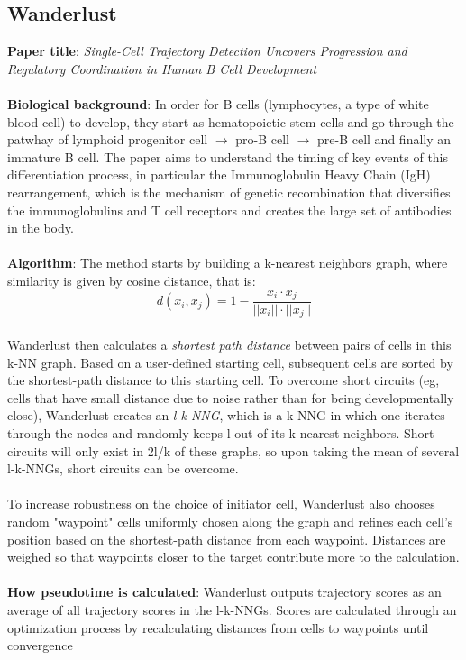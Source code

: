 \documentclass[11pt]{article}
\begin{document}
\subsection{Wanderlust}
\textbf{Paper title}: \emph{Single-Cell Trajectory Detection Uncovers Progression and Regulatory Coordination in Human B Cell Development}\\
\\
\textbf{Biological background}: In order for B cells (lymphocytes, a type of white blood cell) to develop, they start as hematopoietic stem cells and go through the patwhay of lymphoid progenitor cell $\to$ pro-B cell $\to$ pre-B cell and finally an immature B cell. The paper aims to understand the timing of key events of this differentiation process, in particular the Immunoglobulin Heavy Chain (IgH) rearrangement, which is the mechanism of genetic recombination that diversifies the immunoglobulins and T cell receptors and creates the large set of antibodies in the body. \\
\\
\textbf{Algorithm}: The method starts by building a k-nearest neighbors graph, where similarity is given by cosine distance, that is:
$$
d(x_i, x_j) = 1 - \frac{x_i \cdot x_j}{||x_i|| \cdot ||x_j||}
$$
\\
Wanderlust then calculates a \emph{shortest path distance} between pairs of cells in this k-NN graph. Based on a user-defined starting cell, subsequent cells are sorted by the shortest-path distance to this starting cell. To overcome short circuits (eg, cells that have small distance due to noise rather than for being developmentally close), Wanderlust creates an \emph{l-k-NNG}, which is a k-NNG in which one iterates through the nodes and randomly keeps l out of its k nearest neighbors. Short circuits will only exist in 2l/k of these graphs, so upon taking the mean of several l-k-NNGs, short circuits can be overcome. \\
\\
To increase robustness on the choice of initiator cell, Wanderlust also chooses random "waypoint" cells uniformly chosen along the graph and refines each cell's position based on the shortest-path distance from each waypoint. Distances are weighed so that waypoints closer to the target contribute more to the calculation.\\
\\
\textbf{How pseudotime is calculated}: Wanderlust outputs trajectory scores as an average of all trajectory scores in the l-k-NNGs. Scores are calculated through an optimization process by recalculating distances from cells to waypoints until convergence
\end{document}
